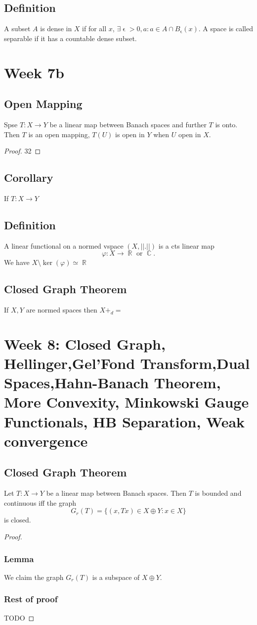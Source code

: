 \documentclass{article}
\DeclareMathOperator\eps{\epsilon}
\DeclareMathOperator\R{\mathbb{R}}
\DeclareMathOperator\C{\mathbb{C}}
\begin{document}
\subsection*{Definition}
A subset $A$ is dense in $X$ if for all $x$, $\exists \eps>0, a: a \in A \cap B_{\eps}(x)$. A space is called separable if it has a countable dense subset.
\section*{Week 7b}
\subsection*{Open Mapping}
Spse $T:X \to Y$ be a linear map between Banach spaces and
further $T$ is onto. Then $T$ is an open mapping, $T(U)$
is open in $Y$ when $U$ open in $X$.
\begin{proof}
32
\end{proof}
\subsection*{Corollary}
If $T: X \to Y$
\subsection*{Definition}
A linear functional on a normed vspace $(X,||.||)$ is a cts linear map $$
\varphi: X \to \R \text{ or } \C.
$$
We have $X \setminus \ker(\varphi) \simeq \R$
\subsection*{Closed Graph Theorem}
If $X,Y$ are normed spaces then $X +_d = $
\section*{Week 8: Closed Graph, Hellinger,Gel'Fond Transform,Dual Spaces,Hahn-Banach Theorem, More Convexity, Minkowski Gauge Functionals, HB Separation, Weak convergence}
\subsection*{Closed Graph Theorem}
Let $T: X \to Y$ be a linear map between Banach spaces. Then $T$ is bounded and continuous iff the graph
$$
G_r(T) = \{(x,Tx) \in X \oplus Y : x \in X \}
$$
is closed.
\begin{proof}
\subsubsection*{Lemma}
We claim the graph $G_r(T)$ is a subspace of $X \oplus Y$.
\subsubsection*{Rest of proof}
TODO
\end{proof}
\end{document}

